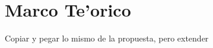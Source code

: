 \chapter{Marco Te'orico}
\label{chap:marcoTeorico}

Copiar y pegar lo mismo de la propuesta, pero extender
\newpage
